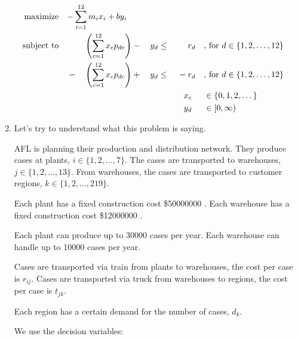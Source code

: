 \documentclass[12pt,letterpaper]{article}
\newcommand*\buck[1]{%
  \$\num{#1}%
}
\begin{document}
\begin{enumerate}
      \begin{alignat*}{9}
        \text{maximize}   \quad \mathrlap{-\sum_{i = 1}^{12}m_i x_i + b y_i}  \\
        \text{subject to} \quad &       &\left(\sum_{c = 1}^{12} x_c p_{dc}\right) & {}-{} & y_d & {}\leq{} &       & r_d            && \text{, for } d \in \{1, 2, \dots, 12\} \\
                                & {}-{} &\left(\sum_{c = 1}^{12} x_c p_{dc}\right) & {}+{} & y_d & {}\leq{} & {}-{} & r_d            && \text{, for } d \in \{1, 2, \dots, 12\} \\
                                &       &                                          &       &     &          &       & \mathclap{x_c} && \in  \{0, 1, 2, \dots\} \\
                                &       &                                          &       &     &          &       & \mathclap{y_d} && \in  [0, \infty) \\
      \end{alignat*}

    \pagebreak

    \item [r11-35)]

      Let's try to understand what this problem is saying.

      AFL is planning their production and distribution network.
      They produce cases at plants, $i \in \{1, 2, \dots, 7\}$.
      The cases are transported to warehouses, $j \in \{1, 2, \dots, 13\}$.
      From warehouses, the cases are transported to customer regions, $k \in \{1, 2, \dots, 219\}$.

      Each plant has a fixed construction cost \buck{50000000}.
      Each warehouse has a fixed construction cost \buck{12000000}.

      Each plant can produce up to \num{30000} cases per year.
      Each warehouse can handle up to \num{10000} cases per year.

      Cases are transported via train from plants to warehouses, the cost per case is $r_{ij}$.
      Cases are transported via truck from warehouses to regions, the cost per case is $t_{jk}$.

      Each region has a certain demand for the number of cases, $d_k$.

      We use the decision variables:


\end{enumerate}
\end{document}
